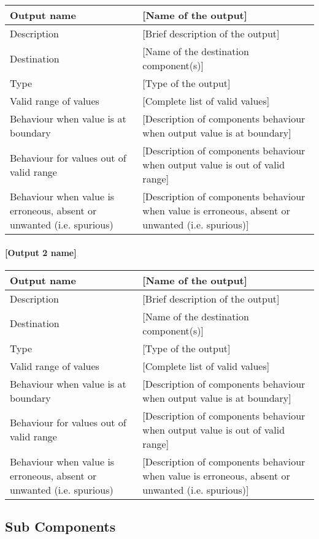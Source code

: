 \begin{longtable}{p{}p{}}
\toprule
Output name				& [Name of the output] \\
\midrule
Description				& [Brief description of the output] \\
\midrule
Destination				& [Name of the destination component(s)] \\ 
\midrule
Type					& [Type of the output] \\
\midrule
Valid range of values	& [Complete list of valid values] \\
\midrule
Behaviour when value is at boundary	& [Description of components behaviour when output value is at boundary] \\
\midrule
Behaviour for values out of valid range	& [Description of components behaviour when output value is out of valid range] \\
\midrule
Behaviour when value is erroneous, absent or unwanted (i.e. spurious) & [Description of components behaviour when value is erroneous, absent or unwanted (i.e. spurious)] \\
\bottomrule
\end{longtable}


\paragraph{[Output 2 name]}

\begin{longtable}{p{}p{}}
\toprule
Output name				& [Name of the output] \\
\midrule
Description				& [Brief description of the output] \\
\midrule
Destination				& [Name of the destination component(s)] \\ 
\midrule
Type					& [Type of the output] \\
\midrule
Valid range of values	& [Complete list of valid values] \\
\midrule
Behaviour when value is at boundary	& [Description of components behaviour when output value is at boundary] \\
\midrule
Behaviour for values out of valid range	& [Description of components behaviour when output value is out of valid range] \\
\midrule
Behaviour when value is erroneous, absent or unwanted (i.e. spurious) & [Description of components behaviour when value is erroneous, absent or unwanted (i.e. spurious)] \\
\bottomrule
\end{longtable}


\subsection{Sub Components}\label{s:manage_track_data_subcomponents}
%

%


